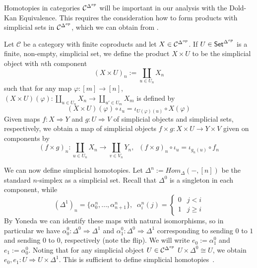 Homotopies in categories $\mathcal{C}^{\Delta^{op}}$ will be important in our analysis with the Dold-Kan Equivalence. This requires the consideration how to form products with simplicial sets in $\mathcal{C}^{\Delta^{op}}$, which we can obtain from \cite[Defn 14.13.1]{StacksProject}.

\begin{defn}
    Let $\mathcal{C}$ be a category with finite coproducts and let $X \in \mathcal{C}^{\Delta^{op}}$. If $U \in \textup{\textsf{Set}}^{\Delta^{op}}$ is a finite, non-empty, simplicial set, we define the product $X \times U$ to be the simplicial object with $n$th component
    \begin{equation*}
        (X\times U)_n := \coprod_{u \in U_n}X_n
    \end{equation*}
    such that for any map $\varphi:[m]\rightarrow [n]$, $(X\times U)(\varphi):\coprod_{u \in U_n}X_n\rightarrow \coprod_{u' \in U_m}X_m$ is defined by
    \begin{equation*}
        (X\times U)(\varphi)\circ \iota_u = \iota_{U(\varphi)(u)}\circ X(\varphi)
    \end{equation*}
    Given maps $f:X\Rightarrow Y$ and $g:U\Rightarrow V$ of simplicial objects and simplicial sets, respectively, we obtain a map of simplicial objects $f\times g:X\times U\rightarrow Y\times V$ given on components by 
    \begin{equation*}
        (f\times g)_n : \coprod_{u \in U_n}X_n\rightarrow \coprod_{v \in V_n}Y_n,\;\; (f\times g)_n\circ \iota_u = \iota_{g_n(u)}\circ f_n
    \end{equation*}
\end{defn}

We can now define simplicial homotopies. Let $\Delta^n := Hom_{\Delta}(-,[n])$ be the standard $n$-simplex as a simplicial set. Recall that $\Delta^0$ is a singleton in each component, while 
\begin{equation*}
    (\Delta^1)_n = \{\alpha_0^n,...,\alpha_{n+1}^n\},\;\;\alpha_i^n(j) = \left\{\begin{array}{cc} 0 & j < i \\ 1 & j \geq i \end{array}\right.
\end{equation*}
By Yoneda we can identify these maps with natural isomorphisms, so in particular we have $\alpha_0^0:\Delta^0\Rightarrow \Delta^1$ and $\alpha_1^0:\Delta^0\Rightarrow \Delta^1$ corresponding to sending $0$ to $1$ and sending $0$ to $0$, respectively (note the flip). We will write $e_0 := \alpha_1^0$ and $e_1 := \alpha_0^0$. Noting that for any simplicial object $U \in \mathcal{C}^{\Delta^{op}}$ $U\times \Delta^0 \cong U$, we obtain $e_0,e_1:U\Rightarrow U\times \Delta^1$. This is sufficient to define simplicial homotopies~\cite[Defn 14.26.1]{StacksProject}.

